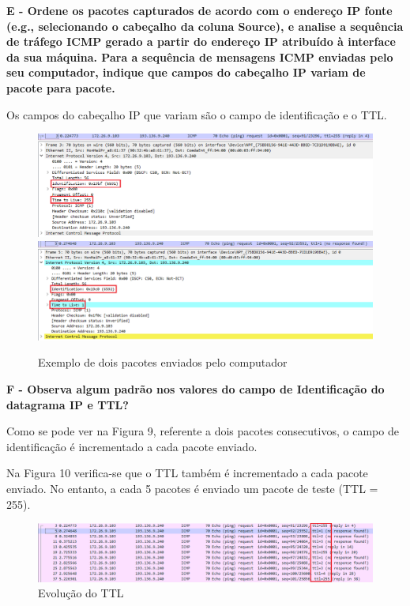 \documentclass[11pt]{article}
\begin{document}
\clearpage

\textbf{E -  Ordene os pacotes capturados de acordo com o endereço IP fonte (e.g., selecionando o cabeçalho da coluna Source), e analise a sequência de tráfego ICMP gerado a partir do endereço IP atribuído à interface da sua máquina. Para a sequência de mensagens ICMP enviadas pelo seu computador, indique que campos do cabeçalho IP variam de pacote para pacote.}

Os campos do cabeçalho IP que variam são o campo de identificação e o TTL.

\begin{figure}[hbt!]
        \includegraphics[width=\linewidth]{images/parte1/default/pacote1.png}
        \centering
        \captionsetup{Pacote 1}
    \endminipage\hfill
        \includegraphics[width=\linewidth]{images/parte1/default/pacote2.png}
        \centering
        \captionsetup{Pacote 2}
    \endminipage
    \caption{Exemplo de dois pacotes enviados pelo computador}
\end{figure}

\vspace{0.5cm}

\textbf{F - Observa algum padrão nos valores do campo de Identificação do datagrama IP e TTL?}

Como se pode ver na Figura 9, referente a dois pacotes consecutivos, o campo de identificação é incrementado a cada pacote enviado.

Na Figura 10 verifica-se que o TTL também é incrementado a cada pacote enviado. No entanto, a cada 5 pacotes é enviado um pacote de teste (TTL = 255).

\begin{figure}[hbt!]
    \centering
    \includegraphics[width=\textwidth]{images/parte1/default/ttl_evolving.png}
    \caption{Evolução do TTL}
\end{figure}
\end{document}
